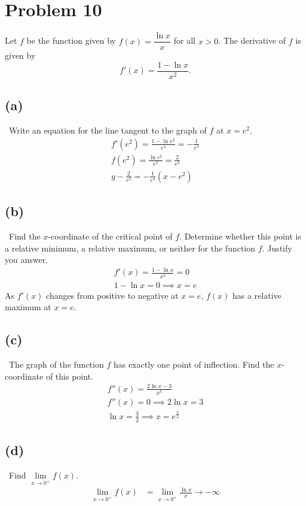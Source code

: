 \documentclass[12pt]{article}
\newcommand{\vem}{\vspace{0.5em}}
\newcommand{\problem}[1]{\section{Problem #1}}
\newcommand{\subproblem}[1]{\subsection{(#1)} \,}
\begin{document}
\problem{10}
Let $f$ be the function given by $f(x)=\dfrac{\ln x}{x}$ for all $x>0$. The derivative of $f$ is given by
\[
f'(x)=\frac{1-\ln x}{x^2}.
\]
\subproblem{a}
Write an equation for the line tangent to the graph of $f$ at $x=e^2$.
\begin{gather*}
    f'(e^2)=\frac{1-\ln e^2}{e^4}=-\frac{1}{e^4}\\
    f(e^2)=\frac{\ln e^2}{e^2}=\frac{2}{e^2}\\
    \boxed{y-\frac{2}{e^2}=-\frac{1}{e^4}(x-e^2)}
\end{gather*}

\subproblem{b}
Find the $x$-coordinate of the critical point of $f$. Determine whether this point is a relative minimum, a relative maximum, or neither for the function $f$. Justify you answer.
\begin{gather*}
    f'(x)=\frac{1-\ln x}{x^2}=0\\
    1-\ln x =0 \implies \boxed{x=e}
\end{gather*}
As $f'(x)$ changes from positive to negative at $x=e$, $f(x)$ has a relative maximum at $x=e$. \vem

\subproblem{c}
The graph of the function $f$ has exactly one point of inflection. Find the $x$-coordinate of this point.
\begin{gather*}
    f''(x)=\frac{2 \ln x-3}{x^3}\\
    f''(x)=0 \implies 2\ln x=3\\
    \ln x=\frac{3}{2}\implies \boxed{x=e^{\frac{3}{2}}}
\end{gather*}

\subproblem{d}
Find $\lim\limits_{x \to 0^+}f(x)$.
\begin{align*}
    \lim\limits_{x \to 0^+}f(x)&=\lim\limits_{x \to 0^+}\frac{\ln x}{x}\to \boxed{-\infty}
\end{align*}
\end{document}

